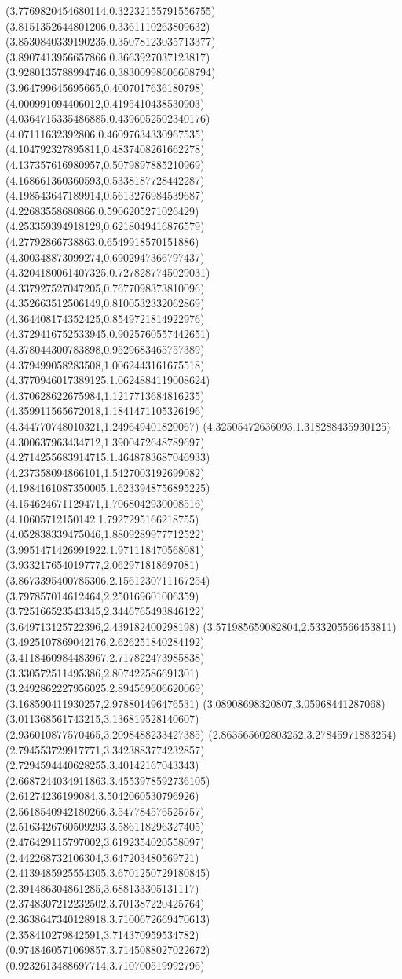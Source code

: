 {(3.7769820454680114,0.32232155791556755)
(3.8151352644801206,0.3361110263809632)
(3.8530840339190235,0.35078123035713377)
(3.8907413956657866,0.3663927037123817)
(3.9280135788994746,0.38300998606608794)
(3.964799645695665,0.4007017636180798)
(4.000991094406012,0.4195410438530903)
(4.0364715335486885,0.4396052502340176)
(4.07111632392806,0.46097634330967535)
(4.104792327895811,0.4837408261662278)
(4.137357616980957,0.5079897885210969)
(4.168661360360593,0.5338187728442287)
(4.198543647189914,0.5613276984539687)
(4.22683558680866,0.5906205271026429)
(4.253359394918129,0.6218049416876579)
(4.27792866738863,0.6549918570151886)
(4.300348873099274,0.6902947366797437)
(4.3204180061407325,0.7278287745029031)
(4.337927527047205,0.7677098373810096)
(4.352663512506149,0.8100532332062869)
(4.364408174352425,0.8549721814922976)
(4.3729416752533945,0.9025760557442651)
(4.378044300783898,0.9529683465757389)
(4.379499058283508,1.0062443161675518)
(4.3770946017389125,1.0624884119008624)
(4.370628622675984,1.1217713684816235)
(4.359911565672018,1.1841471105326196)
(4.344770748010321,1.249649401820067)
(4.32505472636093,1.318288435930125)
(4.300637963434712,1.3900472648789697)
(4.2714255683914715,1.4648783687046933)
(4.237358094866101,1.5427003192699082)
(4.1984161087350005,1.6233948756895225)
(4.154624671129471,1.7068042930008516)
(4.10605712150142,1.7927295166218755)
(4.052838339475046,1.8809289977712522)
(3.9951471426991922,1.971118470568081)
(3.933217654019777,2.062971818697081)
(3.8673395400785306,2.1561230711167254)
(3.797857014612464,2.250169601006359)
(3.725166523543345,2.3446765493846122)
(3.649713125722396,2.439182400298198)
(3.571985659082804,2.533205566453811)
(3.4925107869042176,2.626251840284192)
(3.4118460984483967,2.717822473985838)
(3.330572511495386,2.807422586691301)
(3.2492862227956025,2.894569606620069)
(3.168590411930257,2.978801496476531)
(3.08908698320807,3.05968441287068)
(3.011368561743215,3.136819528140607)
(2.936010877570465,3.2098488233427385)
(2.863565602803252,3.27845971883254)
(2.794553729917771,3.3423883774232857)
(2.7294594440628255,3.40142167043343)
(2.6687244034911863,3.4553978592736105)
(2.61274236199084,3.5042060530796926)
(2.5618540942180266,3.547784576525757)
(2.5163426760509293,3.586118296327405)
(2.476429115797002,3.6192354020558097)
(2.442268732106304,3.647203480569721)
(2.4139485925554305,3.6701250729180845)
(2.391486304861285,3.688133305131117)
(2.3748307212232502,3.701387220425764)
(2.3638647340128918,3.7100672669470613)
(2.358410279842591,3.714370959534782)
(0.9748460571069857,3.7145088027022672)
(0.9232613488697714,3.710700519992796)
}
